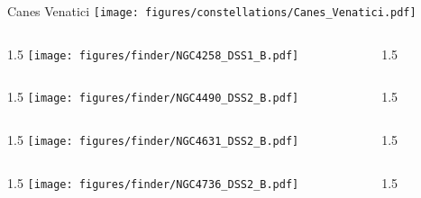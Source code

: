\documentclass[final]{beamer}
\newlength{\colwidth}
\begin{document}

\begin{frame}[t]{\LARGE Canes Venatici}
  \centering
  \texttt{[image: figures/constellations/Canes\_Venatici.pdf]}
\end{frame}


\begin{frame}[t]{}
  \begin{columns}[T]
    \begin{column}{1.5\colwidth}
      \centering
      \texttt{[image: figures/finder/NGC4258\_DSS1\_B.pdf]}
    \end{column}
    \begin{column}{1.5\colwidth}
      \Large
      
    \end{column}
  \end{columns}
  \vspace{\fill}
  \begin{columns}[T]
    \begin{column}{1.5\colwidth}
      \centering
      \texttt{[image: figures/finder/NGC4490\_DSS2\_B.pdf]}
    \end{column}
    \begin{column}{1.5\colwidth}
      \Large
      
    \end{column}
  \end{columns}
\end{frame}


\begin{frame}[t]{}
  \begin{columns}[T]
    \begin{column}{1.5\colwidth}
      \centering
      \texttt{[image: figures/finder/NGC4631\_DSS2\_B.pdf]}
    \end{column}
    \begin{column}{1.5\colwidth}
      \Large
      
    \end{column}
  \end{columns}
  \vspace{\fill}
  \begin{columns}[T]
    \begin{column}{1.5\colwidth}
      \centering
      \texttt{[image: figures/finder/NGC4736\_DSS2\_B.pdf]}
    \end{column}
    \begin{column}{1.5\colwidth}
      \Large
      
    \end{column}
  \end{columns}
\end{frame}
\end{document}
